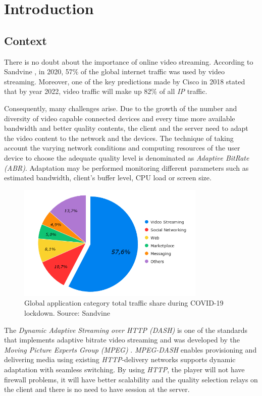 \chapter{Introduction}
\label{chap:introduction}

\section{Context}
\label{sec:context}

There is no doubt about the importance of online video streaming.
According to Sandvine \cite{sandvine1},
in 2020, 57\% of the global internet traffic was used by video streaming.
Moreover, one of the key predictions made by Cisco in 2018 \cite{cisco1}
stated that by year 2022, video traffic will make up 82\% 
of all \textit{IP} traffic.

Consequently, many challenges arise. Due to the
growth of the number and diversity of video capable connected 
devices and every time more available bandwidth and better quality 
contents, the client and the server need to adapt the video content to
the network and the devices. The technique of taking account the 
varying network conditions and computing resources of the user 
device to choose the adequate quality level is denominated as
\textit{Adaptive BitRate (ABR)}. Adaptation may be performed
monitoring different parameters such as estimated bandwidth,
client's buffer level, CPU load or screen size.


\begin{figure}[h]
  \label{fig:chart1}
    \centering
    \includegraphics[width=0.8\textwidth]{img/chart2.png}
    \caption{Global application category total traffic share during COVID-19 lockdown. Source: Sandvine \cite{sandvine1}}
  \end{figure}

The \textit{Dynamic Adaptive Streaming over HTTP (DASH)} is one of the
standards that implements adaptive bitrate video streaming and was developed
by the \textit{Moving Picture Experts Group (MPEG)} \cite{dash1}. \textit{MPEG-DASH} 
enables provisioning and delivering media using existing \textit{HTTP}-delivery 
networks supports dynamic adaptation with seamless switching. By using
\textit{HTTP}, the player will not have firewall problems, it will have better
scalability and the quality selection relays on the client and there is no
need to have session at the server.

